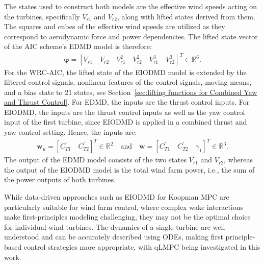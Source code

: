 %
The states used to construct both models are the effective wind speeds acting on the turbines, specifically \( V_{r1} \) and \( V_{r2} \), along with lifted states derived from them. The squares and cubes of the effective wind speeds are utilized as they correspond to aerodynamic force and power dependencies.  The lifted state vector of the AIC scheme's EDMD model is therefore:
\begin{align*}
    \bm{\varphi} = [V_{r1} \quad V_{r2} \quad V^2_{r1} \quad V^2_{r2} \quad  V^3_{r1} \quad V^3_{r2}]^T \in \mathbb{R}^6.
\end{align*}
For the WRC-AIC, the lifted state of the EIODMD model is extended by the filtered control signals, nonlinear features of the control signals, moving means, and a bias state to 21 states, see Section~\ref{sec:lifting functions for Combined Yaw and Thrust Control}.
%
For EDMD, the inputs are the thrust control inputs. For EIODMD, the inputs are the thrust control inputs as well as the yaw control input of the first turbine, since EIODMD is applied in a combined thrust and yaw control setting. Hence, the inputs are:
\begin{align*}
    \bm{w}_{u} = [C^{\prime}_{T1} \quad C^{\prime}_{T2}]^T \in \mathbb{R}^2 \quad\text{and} \quad
    \bm{w} = [C^{\prime}_{T1} \quad C^{\prime}_{T2} \quad \gamma_1]^T \in \mathbb{R}^3.
\end{align*}
The output of the EDMD model consists of the two states \( V_{r1} \) and \( V_{r2} \), whereas the output of the EIODMD model is the total wind farm power, i.e., the sum of the power outputs of both turbines.

While data-driven approaches such as EIODMD for Koopman MPC are particularly 
suitable for wind farm control, where complex wake interactions make first-principles 
modeling challenging, they may not be the optimal choice for individual wind turbines. 
The dynamics of a single turbine are well understood and can be accurately described 
using ODEs, making first principle-based control strategies more appropriate, with qLMPC being investigated in this work. 


